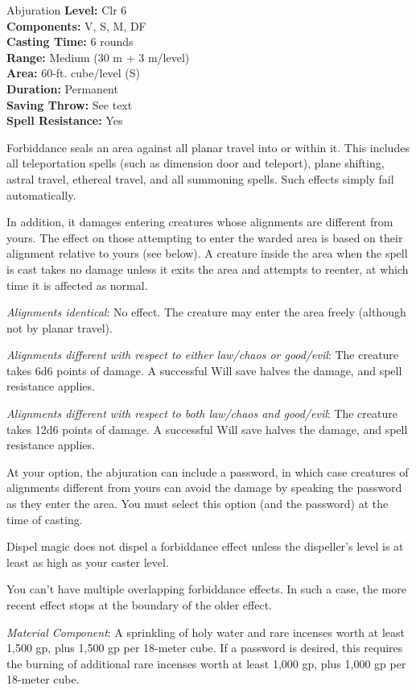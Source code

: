 {Abjuration}
{
	\textbf{Level:}
	Clr 6\\
	\textbf{Components:}
	V, S, M, DF\\
	\textbf{Casting Time:}
	6 rounds\\
	\textbf{Range:}
	Medium (30 m + 3 m/level)\\
	\textbf{Area:}
	60-ft. cube/level (S)\\
	\textbf{Duration:}
	Permanent\\
	\textbf{Saving Throw:}
	See text\\
	\textbf{Spell Resistance:}
	Yes\\
}
{
	Forbiddance seals an area against all planar travel into or within it. This includes all teleportation spells (such as dimension door and teleport), plane shifting, astral travel, ethereal travel, and all summoning spells. Such effects simply fail automatically.

	In addition, it damages entering creatures whose alignments are different from yours. The effect on those attempting to enter the warded area is based on their alignment relative to yours (see below). A creature inside the area when the spell is cast takes no damage unless it exits the area and attempts to reenter, at which time it is affected as normal.

	\textit{Alignments identical}:
	No effect. The creature may enter the area freely (although not by planar travel).

	\textit{Alignments different with respect to either law/chaos or good/evil}:
	The creature takes 6d6 points of damage. A successful Will save halves the damage, and spell resistance applies.

	\textit{Alignments different with respect to both law/chaos and good/evil}:
	The creature takes 12d6 points of damage. A successful Will save halves the damage, and spell resistance applies.

	At your option, the abjuration can include a password, in which case creatures of alignments different from yours can avoid the damage by speaking the password as they enter the area. You must select this option (and the password) at the time of casting.

Dispel magic does not dispel a forbiddance effect unless the dispeller's level is at least as high as your caster level.

	You can't have multiple overlapping forbiddance effects. In such a case, the more recent effect stops at the boundary of the older effect.

	\textit{Material Component}:
	A sprinkling of holy water and rare incenses worth at least 1,500 gp, plus 1,500 gp per 18-meter cube. If a password is desired, this requires the burning of additional rare incenses worth at least 1,000 gp, plus 1,000 gp per 18-meter cube.

}
